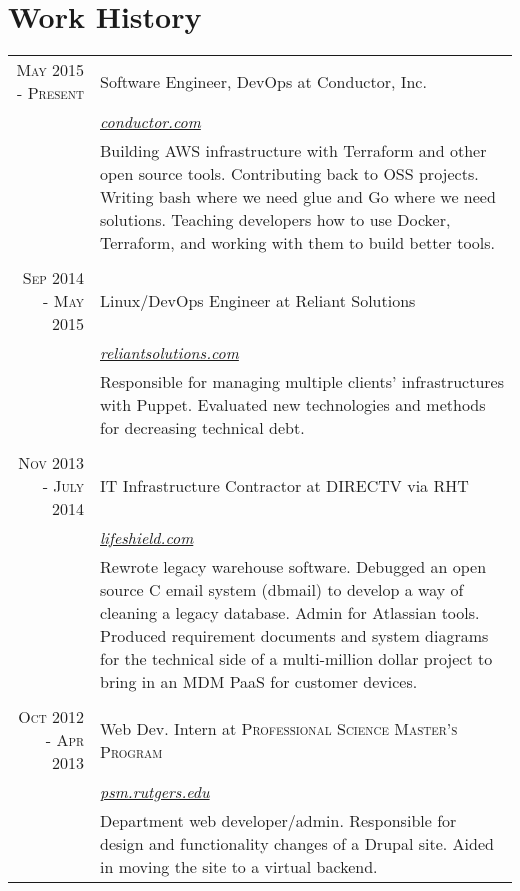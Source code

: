 \documentclass[a4paper, 10pt, onepage]{article} %
\begin{document}
\section{Work History}
\begin{tabular}{r|p{10cm}}
\textsc{May 2015 - Present} & {Software Engineer, DevOps at Conductor, Inc.}\\
&\small\emph{\href{http://conductor.com}{conductor.com}}\\
&\footnotesize{Building AWS infrastructure with Terraform and other open source tools. Contributing back to OSS projects. Writing bash where we need glue and Go where we need solutions. Teaching developers how to use Docker, Terraform, and working with them to build better tools.}\\
\multicolumn{2}{c}{}\\

\textsc{Sep 2014 - May 2015} & {Linux/DevOps Engineer at Reliant Solutions}\\
&\small\emph{\href{http://reliantsolutions.com}{reliantsolutions.com}}\\
&\footnotesize{Responsible for managing multiple clients' infrastructures with Puppet. Evaluated new technologies and methods for decreasing technical debt.}\\

\multicolumn{2}{c}{}\\
\textsc{Nov 2013 - July 2014} & {IT Infrastructure Contractor at DIRECTV via RHT}\\
&\small\emph{\href{http://lifeshield.com}{lifeshield.com}}\\
&\footnotesize{Rewrote legacy warehouse software. Debugged an open source C email system (dbmail) to develop a way of cleaning a legacy database. Admin for Atlassian tools. Produced requirement documents and system diagrams for the technical side of a multi-million dollar project to bring in an MDM PaaS for customer devices.}\\

\multicolumn{2}{c}{}\\
\textsc{Oct 2012 - Apr 2013} & Web Dev. Intern at \textsc{Professional Science Master's Program}\\
& \small\emph{\href{http://psm.rutgers.edu}{psm.rutgers.edu}}\\
& \footnotesize{Department web developer/admin. Responsible for design and functionality changes of a Drupal site. Aided in moving the site to a virtual backend.}\\


\end{tabular}
\end{document}
